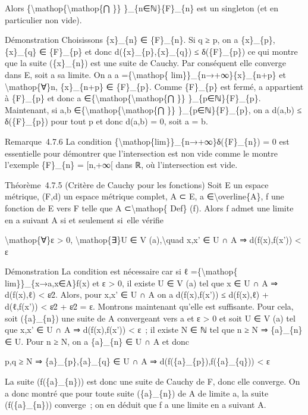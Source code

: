\documentclass[]{article}
\begin{document}
Alors \{\textbackslash{}mathop\{\textbackslash{}mathop\{⋂ \}\}
\}\_\{n∈ℕ\}\{F\}\_\{n\} est un singleton (et en particulier non vide).

Démonstration Choisissons \{x\}\_\{n\} ∈ \{F\}\_\{n\}. Si q ≥ p, on a
\{x\}\_\{p\},\{x\}\_\{q\} ∈ \{F\}\_\{p\} et donc
d(\{x\}\_\{p\},\{x\}\_\{q\}) ≤ δ(\{F\}\_\{p\}) ce qui montre que la
suite (\{x\}\_\{n\}) est une suite de Cauchy. Par conséquent elle
converge dans E, soit a sa limite. On a a =\{\textbackslash{}mathop\{
lim\}\}\_\{n→+∞\}\{x\}\_\{n+p\} et \textbackslash{}mathop\{∀\}n,
\{x\}\_\{n+p\} ∈ \{F\}\_\{p\}. Comme \{F\}\_\{p\} est fermé, a
appartient à \{F\}\_\{p\} et donc a
∈\{\textbackslash{}mathop\{\textbackslash{}mathop\{⋂ \}\}
\}\_\{p∈ℕ\}\{F\}\_\{p\}. Maintenant, si a,b
∈\{\textbackslash{}mathop\{\textbackslash{}mathop\{⋂ \}\}
\}\_\{p∈ℕ\}\{F\}\_\{p\}, on a d(a,b) ≤ δ(\{F\}\_\{p\}) pour tout p et
donc d(a,b) = 0, soit a = b.

Remarque~4.7.6 La condition
\{\textbackslash{}mathop\{lim\}\}\_\{n→+∞\}δ(\{F\}\_\{n\}) = 0 est
essentielle pour démontrer que l'intersection est non vide comme le
montre l'exemple \{F\}\_\{n\} = {[}n,+∞{[} dans ℝ, où l'intersection est
vide.

Théorème~4.7.5 (Critère de Cauchy pour les fonctions) Soit E un espace
métrique, (F,d) un espace métrique complet, A ⊂ E, a
∈\textbackslash{}overline\{A\}, f une fonction de E vers F telle que A
⊂\textbackslash{}mathop\{ Def\} (f). Alors f admet une limite en a
suivant A si et seulement si~elle vérifie

\textbackslash{}mathop\{∀\}ε \textgreater{} 0,
\textbackslash{}mathop\{∃\}U ∈ V (a),\textbackslash{}quad x,x' ∈ U ∩ A ⇒
d(f(x),f(x')) \textless{} ε

Démonstration La condition est nécessaire car si ℓ
=\{\textbackslash{}mathop\{ lim\}\}\_\{x→a,x∈A\}f(x) et ε \textgreater{}
0, il existe U ∈ V (a) tel que x ∈ U ∩ A ⇒ d(f(x),ℓ) \textless{} ε∕2.
Alors, pour x,x' ∈ U ∩ A on a d(f(x),f(x')) ≤ d(f(x),ℓ) + d(ℓ,f(x'))
\textless{} ε∕2 + ε∕2 = ε. Montrons maintenant qu'elle est suffisante.
Pour cela, soit (\{a\}\_\{n\}) une suite de A convergeant vers a et ε
\textgreater{} 0 et soit U ∈ V (a) tel que x,x' ∈ U ∩ A ⇒ d(f(x),f(x'))
\textless{} ε~; il existe N ∈ ℕ tel que n ≥ N ⇒ \{a\}\_\{n\} ∈ U. Pour n
≥ N, on a \{a\}\_\{n\} ∈ U ∩ A et donc

p,q ≥ N ⇒ \{a\}\_\{p\},\{a\}\_\{q\} ∈ U ∩ A ⇒
d(f(\{a\}\_\{p\}),f(\{a\}\_\{q\})) \textless{} ε

La suite (f(\{a\}\_\{n\})) est donc une suite de Cauchy de F, donc elle
converge. On a donc montré que pour toute suite (\{a\}\_\{n\}) de A de
limite a, la suite (f(\{a\}\_\{n\})) converge~; on en déduit que f a une
limite en a suivant A.
\end{document}
